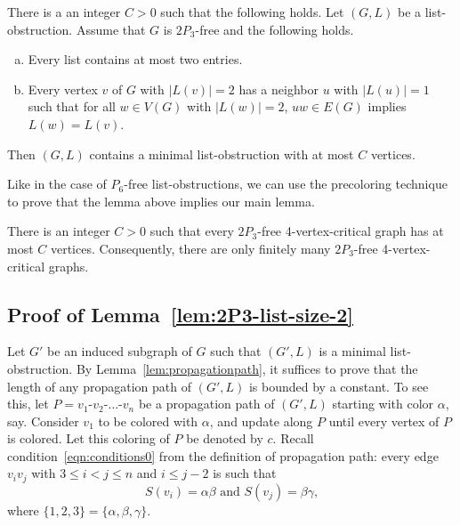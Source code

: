 \documentclass[11pt]{article}
\begin{document}
\begin{lemma}\label{lem:2P3-list-size-2}
There is a an integer $C>0$ such that the following holds.
Let $(G,L)$ be a list-obstruction.
Assume that $G$ is $2P_3$-free and the following holds.
\begin{enumerate}[(a)]
	\item Every list contains at most two entries.
	\item Every vertex $v$ of $G$ with $|L(v)|=2$ has a neighbor $u$ with $|L(u)|=1$ such that for all $w \in V(G)$ with $|L(w)|=2$, $uw \in E(G)$ implies $L(w)=L(v)$.
\end{enumerate}
Then $(G,L)$ contains a minimal list-obstruction with at most $C$ vertices.
\end{lemma}

Like in the case of $P_6$-free list-obstructions, we can use the precoloring technique to prove that the lemma above implies our main lemma.

\begin{lemma}\label{lem:2P3-reduction}
There is an integer $C>0$ such that every $2P_3$-free 4-vertex-critical graph
has at most $C$ vertices. Consequently,
there are only finitely many $2P_3$-free 4-vertex-critical graphs.
\end{lemma}

\subsection{Proof of Lemma~\ref{lem:2P3-list-size-2}}

Let $G'$ be an induced subgraph of $G$ such that $(G',L)$ is a minimal list-obstruction.
By Lemma~\ref{lem:propagationpath}, it suffices to prove that the length of any propagation path of $(G',L)$ is bounded by a constant.
To see this, let $P=v_1$-$v_2$-$\ldots $-$v_n$ be a propagation path of $(G',L)$ starting with color $\alpha$, say.
Consider $v_1$ to be colored with $\alpha$, and update along $P$ until every vertex of $P$ is colored.
Let this coloring of $P$ be denoted by $c$.
Recall condition~\eqref{eqn:conditions0} from the definition of propagation path: every edge $v_iv_j$ with $3 \le i < j \le n$ and $i \le j-2$ is such that 
\begin{equation*}
\mbox{$S(v_i)=\alpha\beta$ and $S(v_j)=\beta\gamma$,} 
\end{equation*}
where $\{1,2,3\} = \{\alpha,\beta,\gamma\}$.
\end{document}
